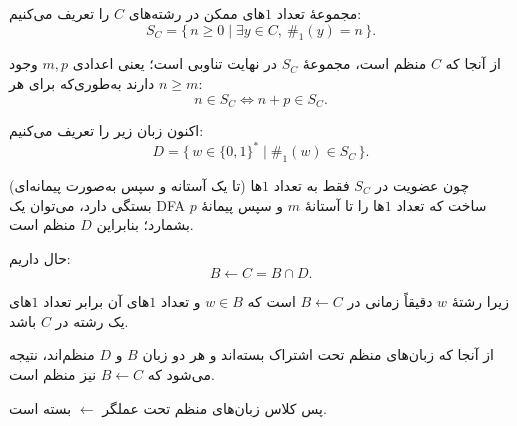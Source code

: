 مجموعهٔ تعداد $1$های ممکن در رشته‌های $C$ را تعریف می‌کنیم:
\[
S_C=\{\, n\ge 0 \mid \exists y\in C,\ \#_1(y)=n \,\}.
\]

از آنجا که $C$ منظم است، مجموعهٔ $S_C$ در نهایت تناوبی است؛
یعنی اعدادی $m,p$ وجود دارند به‌طوری‌که برای هر $n\ge m$:
\[
n\in S_C \iff n+p\in S_C.
\]

اکنون زبان زیر را تعریف می‌کنیم:
\[
D=\{\, w\in \{0,1\}^* \mid \#_1(w)\in S_C \,\}.
\]

چون عضویت در $S_C$ فقط به تعداد $1$ها (تا یک آستانه و سپس
به‌صورت پیمانه‌ای) بستگی دارد، می‌توان یک DFA ساخت که تعداد
$1$ها را تا آستانهٔ $m$ و سپس پیمانهٔ $p$ بشمارد؛
بنابراین $D$ منظم است.

حال داریم:
\[
B \leftarrow C = B \cap D.
\]

زیرا رشتهٔ $w$ دقیقاً زمانی در $B\leftarrow C$ است که $w\in B$ و تعداد $1$های آن برابر تعداد $1$های یک رشته در $C$ باشد.


از آنجا که زبان‌های منظم تحت اشتراک بسته‌اند و هر دو زبان
$B$ و $D$ منظم‌اند، نتیجه می‌شود که
\(
B \leftarrow C
\)
نیز منظم است.

پس کلاس زبان‌های منظم تحت عملگر $\leftarrow$ بسته است.
